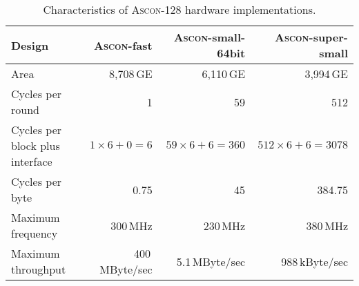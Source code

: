 \documentclass[runningheads]{llncs}
\begin{document}
\begin{table}[htb]
  \caption{Characteristics of \textsc{Ascon}-128 hardware implementations.}
\label{tbl:hw-char}
\centering
\begin{tabular}{l@{\hskip 12pt}r@{\hskip 12pt}r@{\hskip 12pt}r} \toprule
  Design & \textsc{Ascon}-fast & \textsc{Ascon}-small-64bit & \textsc{Ascon}-super-small \\
  \midrule
  Area                             & 8,708\,GE            & 6,110\,GE               & 3,994\,GE                 \\
  Cycles per round                 & 1                    & 59                      & 512                       \\
  Cycles per block plus interface  & $1 \times 6 + 0 = 6$ & $59 \times 6 + 6 = 360$ & $512 \times 6 + 6 = 3078$ \\
  Cycles per byte                  & 0.75                 & 45                      & 384.75                    \\
  Maximum frequency                & 300\,MHz             & 230\,MHz                & 380\,MHz                  \\
  Maximum throughput               & 400\,MByte/sec       & 5.1\,MByte/sec          & 988\,kByte/sec            \\
  \bottomrule %
\end{tabular}
\end{table}%



\vspace*{-.5cm} %


 

\appendix
\end{document}
